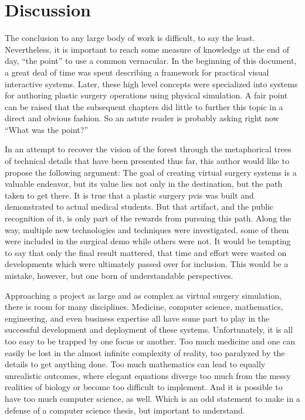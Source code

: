 
\chapter{Discussion}
\label{chp:discussion}

The conclusion to any large body of work is difficult, to say the
least. Nevertheless, it is important to reach some measure of
knowledge at the end of day, ``the point'' to use a common
vernacular. In the beginning of this document, a great deal of time
was spent describing a framework for practical visual interactive
systems. Later, these high level concepts were specialized into
systems for authoring plastic surgery operations using physical
simulation. A fair point can be raised that the subsequent chapters
did little to further this topic in a direct and obvious fashion. So
an astute reader is probably asking right now ``What was the point?''

In an attempt to recover the vision of the forest through the
metaphorical trees of technical details that have been presented thus
far, this author would like to propose the following argument: The
goal of creating virtual surgery systems is a valuable endeavor, but
its value lies not only in the destination, but the path taken to get
there. It is true that a plastic surgery \gls{pvis} was built and
demonstrated to actual medical students. But that artifact, and the
public recognition of it, is only part of the rewards from pursuing
this path. Along the way, multiple new technologies and techniques
were investigated, some of them were included in the surgical demo
while others were not. It would be tempting to say that only the final
result mattered, that time and effort were wasted on developments
which were ultimately passed over for inclusion. This would be a
mistake, however, but one born of understandable perspectives.

Approaching a project as large and as complex as virtual surgery
simulation, there is room for many disciplines. Medicine, computer
science, mathematics, engineering, and even business expertise all
have some part to play in the successful development and deployment of
these systems. Unfortunately, it is all too easy to be trapped by one
focus or another. Too much medicine and one can easily be lost in the
almost infinite complexity of reality, too paralyzed by the details
to get anything done. Too much mathematics can lead to equally
unrealistic outcomes, where elegant equations diverge too much from
the messy realities of biology or become too difficult to
implement. And it is possible to have too much computer science, as
well. Which is an odd statement to make in a defense of a computer
science thesis, but important to understand.

